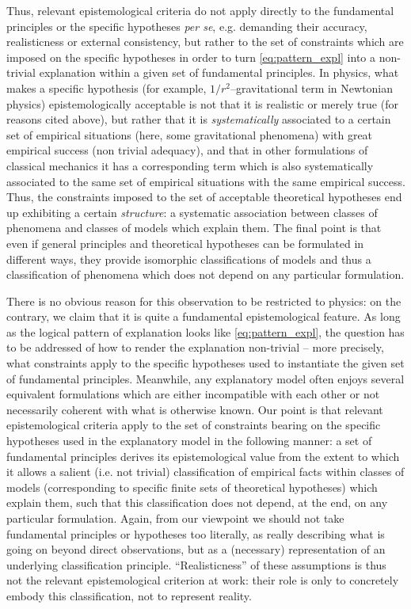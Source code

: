 \documentclass[a4paper,11pt]{article}
\theoremstyle{definition}
\begin{document}
Thus, relevant epistemological criteria do not apply directly to the fundamental principles or the specific hypotheses \textit{per se}, e.g. demanding their accuracy, realisticness or external consistency, but rather to the set of constraints which are imposed on the specific hypotheses in order to turn \eqref{eq:pattern_expl} into a non-trivial explanation within a given set of fundamental principles. In physics, what makes a specific hypothesis (for example, $1/r^2$--gravitational term in Newtonian physics) epistemologically acceptable is not that it is realistic or merely true (for reasons cited above), but rather that it is \textit{systematically} associated to a certain set of empirical situations (here, some gravitational phenomena) with great empirical success (non trivial adequacy), and that in other formulations of classical mechanics it has a corresponding term which is also systematically associated to the same set of empirical situations with the same empirical success. Thus, the constraints imposed to the set of acceptable theoretical hypotheses end up exhibiting a certain \textit{structure}: a systematic association between classes of phenomena and classes of models which explain them. The final point is that even if general principles and theoretical hypotheses can be formulated in different ways, they provide isomorphic classifications of models and thus a classification of phenomena which does not depend on any particular formulation. 

There is no obvious reason for this observation to be restricted to physics: on the contrary, we claim that it is quite a fundamental epistemological feature. As long as the logical pattern of explanation looks like \eqref{eq:pattern_expl}, the question has to be addressed of how to render the explanation non-trivial -- more precisely, what constraints apply to the specific hypotheses used to instantiate the given set of fundamental principles. Meanwhile, any explanatory model often enjoys several equivalent formulations which are either incompatible with each other or not necessarily coherent with what is otherwise known. Our point is that relevant epistemological criteria apply to the set of constraints bearing on the specific hypotheses used in the explanatory model in the following manner: a set of fundamental principles derives its epistemological value from the extent to which it allows a salient (i.e. not trivial) classification of empirical facts within classes of models (corresponding to specific finite sets of theoretical hypotheses) which explain them, such that this classification does not depend, at the end, on any particular formulation. Again, from our viewpoint we should not take fundamental principles or hypotheses too literally, as really describing what is going on beyond direct observations, but as a (necessary) representation of an underlying classification principle. ``Realisticness'' of these assumptions is thus not the relevant epistemological criterion at work: their role is only to concretely embody this classification, not to represent reality. 
\end{document}
